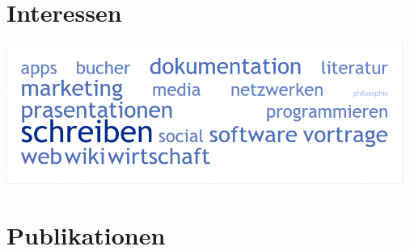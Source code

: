 \documentclass[a4paper]{friggeri-cv} %
\begin{document}

\section{Interessen}
\includegraphics[width=13cm]{../Pictures/Interessen.png}

\newpage
\section{Publikationen}





\end{document}
